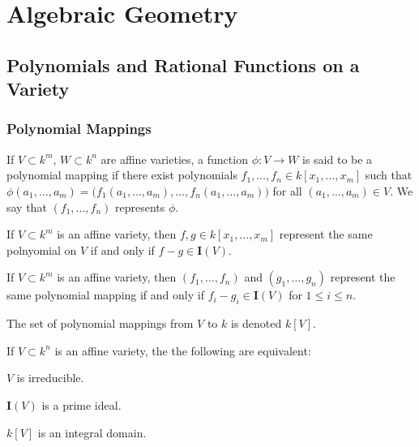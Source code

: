 \documentclass[crop=false,class=article,oneside]{standalone}
\begin{document}
    \ifx\ifsub\undefined
        \section*{Algebraic Geometry}
        \setcounter{section}{1}
    \fi
    \subsection{Polynomials and Rational Functions on a Variety}
        \subsubsection{Polynomial Mappings}
            \begin{definition}
                If $V\subset k^m$, $W\subset k^n$ are affine
                varieties, a function $\phi:V\rightarrow W$ is
                said to be a polynomial mapping if there exist
                polynomials $f_1,\hdots, f_n\in k[x_1,\hdots, x_m]$
                such that
                $\phi(a_1,\hdots, a_m)%
                 =\big(%
                     f_1(a_1,\hdots,a_m),\hdots,f_n(a_1,\hdots, a_m)%
                  \big)$
                for all $(a_1,\hdots, a_m) \in V$. We say that
                $(f_1,\hdots, f_n)$ represents $\phi$.
            \end{definition}
            \begin{theorem}
                If $V\subset k^m$ is an affine variety,
                then $f,g\in k[x_1,\hdots, x_m]$ represent the
                same polnyomial on $V$ if and only if
                $f-g\in\textbf{I}(V)$.
            \end{theorem}
            \begin{theorem}
                If $V\subset k^m$ is an affine variety, then
                $(f_1,\hdots, f_n)$ and $(g_1,\hdots, g_n)$
                represent the same polynomial mapping if and only
                if $f_i-g_i \in \textbf{I}(V)$ for $1\leq i \leq n$.
            \end{theorem}
            \begin{notation}
                The set of polynomial mappings from
                $V$ to $k$ is denoted $k[V]$.
            \end{notation}
            \begin{theorem}
                If $V\subset k^n$ is an affine variety,
                the the following are equivalent:
                \begin{enumerate}
                    \begin{multicols}{3}
                        \item $V$ is irreducible.
                        \item $\textbf{I}(V)$ is a prime ideal.
                        \item $k[V]$ is an integral domain.
                    \end{multicols}
                \end{enumerate}
            \end{theorem}
\end{document}
